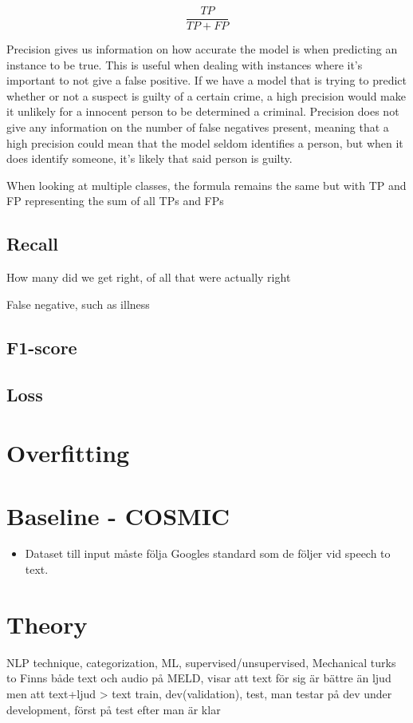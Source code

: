\documentclass[nofilelist]{cslthse-msc}
\begin{document}
$$\frac{TP}{TP + FP}$$

Precision gives us information on how accurate the model is when predicting an instance to be true. This is useful when dealing with instances where it's important to not give a false positive. If we have a model that is trying to predict whether or not a suspect is guilty of a certain crime, a high precision would make it unlikely for a innocent person to be determined a criminal. 
Precision does not give any information on the number of false negatives present, meaning that a high precision could mean that the model seldom identifies a person, but when it does identify someone, it's likely that said person is guilty.

When looking at multiple classes, the formula remains the same but with TP and FP representing the sum of all TPs and FPs

\subsection{Recall}

How many did we get right, of all that were actually right

False negative, such as illness
\subsection{F1-score}


\subsection{Loss}

\section{Overfitting}





\section{Baseline - COSMIC}
\begin{itemize}
    \item Dataset till input måste följa Googles standard som de följer vid speech to text. 
\end{itemize}

\section{Theory}
NLP technique, categorization, ML, supervised/unsupervised,  
Mechanical turks to 
Finns både text och audio på MELD, \citep{zhang2019modeling} visar att text för sig är bättre än ljud men att text+ljud > text
train, dev(validation), test, man testar på dev under development, först på test efter man är klar
\end{document}
